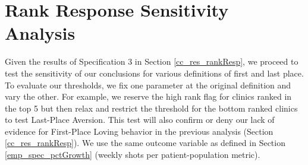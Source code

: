  \begin{table}
 \end{table}

\section{Rank Response Sensitivity Analysis} \label{app_cc_rankResp_sens}
Given the results of Specification 3 in Section \ref{cc_res_rankResp}, we proceed to test the sensitivity of our conclusions for various definitions of first and last place. To evaluate our thresholds, we fix one parameter at the original definition and vary the other. For example, we reserve the high rank flag for clinics ranked in the top 5 but then relax and restrict the threshold for the bottom ranked clinics to test Last-Place Aversion. This test will also confirm or deny our lack of evidence for First-Place Loving behavior in the previous analysis (Section \ref{cc_res_rankResp}). We use the same outcome variable as defined in Section \ref{emp_spec_pctGrowth} (weekly shots per patient-population metric).

